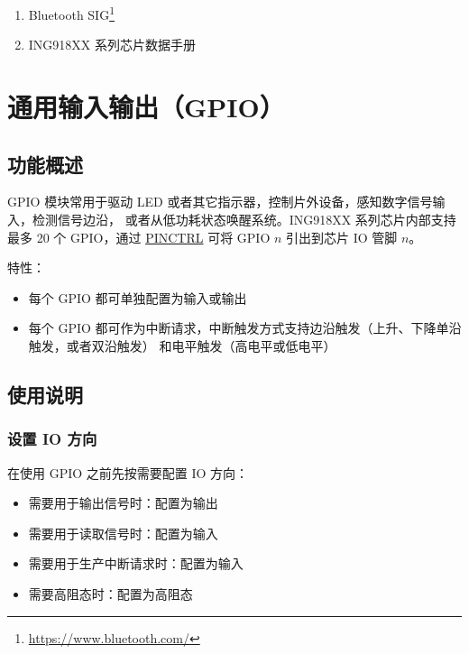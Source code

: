 \documentclass[
  12pt,
]{book}
\providecommand{\tightlist}{%
  \setlength{\itemsep}{0pt}\setlength{\parskip}{0pt}}
\begin{document}
\begin{enumerate}
\def\labelenumi{\arabic{enumi}.}
\tightlist
\item
  Bluetooth SIG\footnote{\url{https://www.bluetooth.com/}}
\item
  ING918XX 系列芯片数据手册
\end{enumerate}

\hypertarget{ux901aux7528ux8f93ux5165ux8f93ux51fagpio}{%
\chapter{通用输入输出（GPIO）}\label{ux901aux7528ux8f93ux5165ux8f93ux51fagpio}}

\hypertarget{ux529fux80fdux6982ux8ff0}{%
\section{功能概述}\label{ux529fux80fdux6982ux8ff0}}

GPIO 模块常用于驱动 LED 或者其它指示器，控制片外设备，感知数字信号输入，检测信号边沿，
或者从低功耗状态唤醒系统。ING918XX 系列芯片内部支持最多 20 个 GPIO，通过 \protect\hyperlink{ch-pinctrl}{PINCTRL}
可将 GPIO \(n\) 引出到芯片 IO 管脚 \(n\)。

特性：

\begin{itemize}
\tightlist
\item
  每个 GPIO 都可单独配置为输入或输出
\item
  每个 GPIO 都可作为中断请求，中断触发方式支持边沿触发（上升、下降单沿触发，或者双沿触发）
  和电平触发（高电平或低电平）
\end{itemize}

\hypertarget{ux4f7fux7528ux8bf4ux660e}{%
\section{使用说明}\label{ux4f7fux7528ux8bf4ux660e}}

\hypertarget{ux8bbeux7f6e-io-ux65b9ux5411}{%
\subsection{设置 IO 方向}\label{ux8bbeux7f6e-io-ux65b9ux5411}}

在使用 GPIO 之前先按需要配置 IO 方向：

\begin{itemize}
\tightlist
\item
  需要用于输出信号时：配置为输出
\item
  需要用于读取信号时：配置为输入
\item
  需要用于生产中断请求时：配置为输入
\item
  需要高阻态时：配置为高阻态
\end{itemize}
\end{document}
